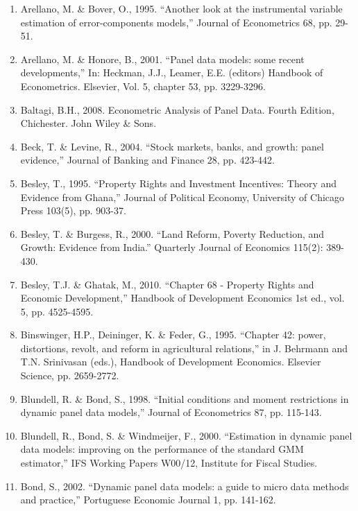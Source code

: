 \documentclass[12pt,a4paper,english]{article}%
\begin{document}
\begin{enumerate}
\item Arellano, M. \& Bover, O., 1995. ``Another look at the instrumental variable estimation of error-components models,'' Journal of Econometrics 68, pp. 29-51.

\item Arellano, M. \& Honore, B., 2001. ``Panel data models: some recent developments,'' In: Heckman, J.J., Leamer, E.E. (editors) Handbook of Econometrics. Elsevier, Vol. 5, chapter 53, pp. 3229-3296.

\item Baltagi, B.H., 2008. Econometric Analysis of Panel Data. Fourth Edition, Chichester. John Wiley \& Sons.

\item Beck, T. \& Levine, R., 2004. ``Stock markets, banks, and growth: panel evidence,'' Journal of Banking
and Finance 28, pp. 423-442.

\item Besley, T., 1995. ``Property Rights and Investment Incentives: Theory and Evidence from Ghana,'' Journal of Political Economy, University of Chicago Press 103(5), pp. 903-37.

\item Besley, T. \& Burgess, R., 2000. ``Land Reform, Poverty Reduction, and Growth: Evidence from India.'' Quarterly Journal of Economics 115(2): 389-430.

\item Besley, T.J. \& Ghatak, M., 2010. ``Chapter 68 - Property Rights and Economic Development,'' Handbook of Development Economics 1st ed., vol. 5, pp. 4525-4595.

\item Binswinger, H.P., Deininger, K. \& Feder, G., 1995. ``Chapter 42: power, distortions, revolt, and reform in agricultural relations,'' in J. Behrmann and T.N. Srinivasan (eds.), Handbook of Development Economics. Elsevier Science, pp. 2659-2772.

\item Blundell, R. \& Bond, S., 1998. ``Initial conditions and moment restrictions in dynamic panel data models,'' Journal of Econometrics 87, pp. 115-143.

\item Blundell, R., Bond, S. \& Windmeijer, F., 2000.
``Estimation in dynamic panel data models: improving on the performance of the standard GMM estimator,'' IFS Working Papers W00/12, Institute for Fiscal Studies.

\item Bond, S., 2002. ``Dynamic panel data models:
a guide to micro data methods and practice,'' Portuguese Economic Journal 1, pp. 141-162.


\end{enumerate}
\end{document}

